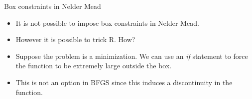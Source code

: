 \documentclass[10pt]{beamer}
\begin{document}
                                                                                              \begin{frame}{Box constraints in Nelder Mead}
                                                                                                \begin{itemize}
                                                                                                \item It is not possible to impose box constraints in Nelder Mead.

                                                                                                \item However it is possible to trick R.  How?

                                                                                                \item Suppose the problem is a minimization.  We can use an {\em if} statement to force the function to be extremely large outside the box.

                                                                                                \item This is not an option in BFGS since this induces a discontinuity in the function.
                                                                                                \end{itemize}
                                                                                              \end{frame}
\end{document}

